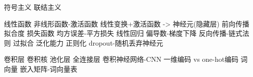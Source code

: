 符号主义
联结主义

线性函数
非线形函数-激活函数
线性变换+激活函数 -> 神经元(隐藏层)
前向传播
拟合度
损失函数
均方误差-平方损失
线性回归
偏导数-梯度下降
反向传播-链式法则
过拟合
泛化能力
正则化
dropout-随机丢弃神经元

卷积层
卷积核
池化层
全连接层
卷积神经网络-CNN
一维编码 vs one-hot编码
词向量
嵌入矩阵-词向量表